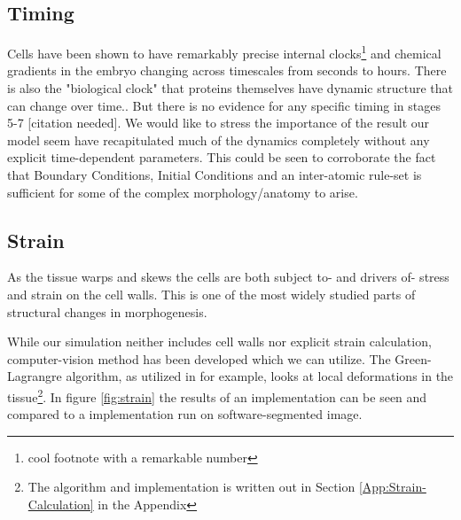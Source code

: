 \subsection{Timing}
Cells have been shown to have remarkably precise internal clocks\footnote{cool footnote with a remarkable number\cite{cellinternal}} and chemical gradients in the embryo changing across timescales from seconds to hours\cite{shvartsman2008dynamics}. There is also the "biological clock"\cite{johanolsen2} that proteins themselves have dynamic structure that can change over time.\cite{johanolsen1}. But there is no evidence for any specific timing in stages 5-7 [citation needed]. We would like to stress the importance of the result our model seem have recapitulated much of the dynamics completely without any explicit time-dependent parameters. This could be seen to corroborate the fact that Boundary Conditions, Initial Conditions and an inter-atomic rule-set is sufficient for some of the complex morphology/anatomy to arise. 


\subsection{Strain}
As the tissue warps and skews the cells are both subject to- and drivers of- stress and strain on the cell walls. This is one of the most widely studied parts of structural changes in morphogenesis.

While our simulation neither includes cell walls nor explicit strain calculation, computer-vision method has been developed which we can utilize. The Green-Lagrangre algorithm, as utilized in \cite{butler2009cell} for example, looks at local deformations in the tissue\footnote{The algorithm and implementation is written out in Section \ref{App:Strain-Calculation} in the Appendix}. In figure \ref{fig:strain} the results of an implementation can be seen and compared to a implementation run on software-segmented image.

